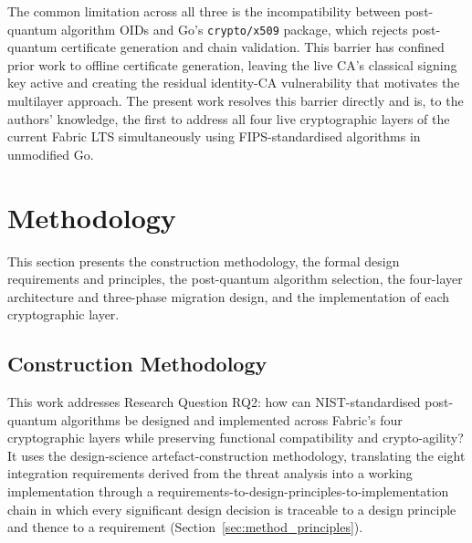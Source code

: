 \documentclass{ieeetj}
\begin{document}
The common limitation across all three is the incompatibility between
post-quantum algorithm OIDs and Go's \texttt{crypto/x509} package, which rejects
post-quantum certificate generation and chain validation. This barrier has
confined prior work to offline certificate generation, leaving the live CA's
classical signing key active and creating the residual identity-CA vulnerability
that motivates the multilayer approach. The present work resolves this barrier
directly and is, to the authors' knowledge, the first to address all four live
cryptographic layers of the current Fabric LTS simultaneously using
FIPS-standardised algorithms in unmodified Go. 
\section{Methodology} \label{sec:methodology}

This section presents the construction methodology, the formal design
requirements and principles, the post-quantum algorithm selection, the
four-layer architecture and three-phase migration design, and the implementation
of each cryptographic layer.

\subsection{Construction Methodology}
\label{sec:method_construction}

This work addresses Research Question RQ2: how can NIST-standardised
post-quantum algorithms be designed and implemented across Fabric's four
cryptographic layers while preserving functional compatibility and
crypto-agility? It uses the design-science artefact-construction methodology,
translating the eight integration requirements derived from the threat analysis
into a working implementation through a
requirements-to-design-principles-to-implementation chain in which every
significant design decision is traceable to a design principle and thence to a
requirement (Section~\ref{sec:method_principles}).
\end{document}
